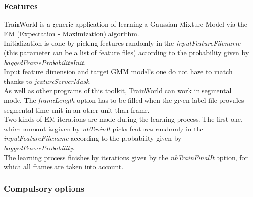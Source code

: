 \documentclass[a4paper]{article}
\begin{document}
\subsubsection{Features}
TrainWorld is a generic application of learning a Gaussian Mixture Model via the EM (Expectation - Maximization) algorithm.\\
Initialization is done by picking features randomly in the \textit{inputFeatureFilename} (this parameter can be a list of feature files) according to the probability given by \textit{baggedFrameProbabilityInit}.\\
Input feature dimension and target GMM model's one do not have to match thanks to \textit{featureServerMask}.\\
As well as other programs of this toolkit, TrainWorld can work in segmental mode. The \textit{frameLength} option has to be filled when the given label file provides segmental time unit in an other unit than frame.\\
Two kinds of EM iterations are made during the learning process. The first one, which amount is given by \textit{nbTrainIt} picks features randomly in the \textit{inputFeatureFilename} according to the probability given by \textit{baggedFrameProbability}.\\
The learning process finishes by iterations given by the \textit{nbTrainFinalIt} option, for which all frames are taken into account.\\

\subsubsection{Compulsory options}
\end{document}
